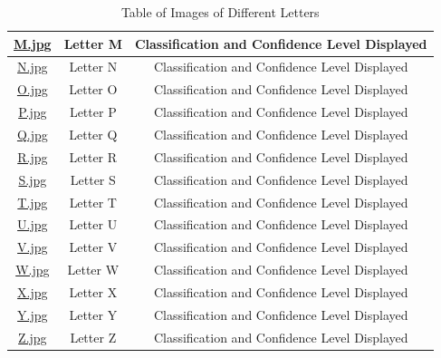 \documentclass[12pt, titlepage]{article}
\begin{document}
\begin{table}[h!]
\begin{tabular}{|c|c|c|}
    \href{https://github.com/cer-hunter/OAR-CAS741/tree/main/tests/test-images/M.jpg}{M.jpg} & Letter M & Classification and Confidence Level Displayed\\ \hline
    \href{https://github.com/cer-hunter/OAR-CAS741/tree/main/tests/test-images/N.jpg}{N.jpg} & Letter N & Classification and Confidence Level Displayed\\ \hline
    \href{https://github.com/cer-hunter/OAR-CAS741/tree/main/tests/test-images/O.jpg}{O.jpg} & Letter O & Classification and Confidence Level Displayed\\ \hline
    \href{https://github.com/cer-hunter/OAR-CAS741/tree/main/tests/test-images/P.jpg}{P.jpg} & Letter P & Classification and Confidence Level Displayed\\ \hline
    \href{https://github.com/cer-hunter/OAR-CAS741/tree/main/tests/test-images/Q.jpg}{Q.jpg} & Letter Q & Classification and Confidence Level Displayed\\ \hline
    \href{https://github.com/cer-hunter/OAR-CAS741/tree/main/tests/test-images/R.jpg}{R.jpg} & Letter R & Classification and Confidence Level Displayed\\ \hline
    \href{https://github.com/cer-hunter/OAR-CAS741/tree/main/tests/test-images/S.jpg}{S.jpg} & Letter S & Classification and Confidence Level Displayed\\ \hline
    \href{https://github.com/cer-hunter/OAR-CAS741/tree/main/tests/test-images/T.jpg}{T.jpg} & Letter T & Classification and Confidence Level Displayed\\ \hline
    \href{https://github.com/cer-hunter/OAR-CAS741/tree/main/tests/test-images/U.jpg}{U.jpg} & Letter U & Classification and Confidence Level Displayed\\ \hline
    \href{https://github.com/cer-hunter/OAR-CAS741/tree/main/tests/test-images/V.jpg}{V.jpg} & Letter V & Classification and Confidence Level Displayed\\ \hline
    \href{https://github.com/cer-hunter/OAR-CAS741/tree/main/tests/test-images/W.jpg}{W.jpg} & Letter W & Classification and Confidence Level Displayed\\ \hline
    \href{https://github.com/cer-hunter/OAR-CAS741/tree/main/tests/test-images/X.jpg}{X.jpg} & Letter X & Classification and Confidence Level Displayed\\ \hline
    \href{https://github.com/cer-hunter/OAR-CAS741/tree/main/tests/test-images/Y.jpg}{Y.jpg} & Letter Y & Classification and Confidence Level Displayed\\ \hline
    \href{https://github.com/cer-hunter/OAR-CAS741/tree/main/tests/test-images/Z.jpg}{Z.jpg} & Letter Z & Classification and Confidence Level Displayed\\ \hline
  \end{tabular}
  \caption{Table of Images of Different Letters}
  \label{table_labels}
\end{table}
\end{document}
